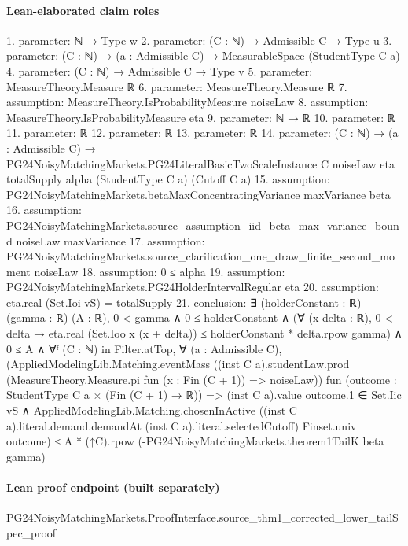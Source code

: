 \documentclass[10pt]{article}
\begin{document}
\paragraph{Lean-elaborated claim roles}\begin{ReviewVerbatim}
1. parameter: ℕ → Type w
2. parameter: (C : ℕ) → Admissible C → Type u
3. parameter: (C : ℕ) → (a : Admissible C) → MeasurableSpace (StudentType C a)
4. parameter: (C : ℕ) → Admissible C → Type v
5. parameter: MeasureTheory.Measure ℝ
6. parameter: MeasureTheory.Measure ℝ
7. assumption: MeasureTheory.IsProbabilityMeasure noiseLaw
8. assumption: MeasureTheory.IsProbabilityMeasure eta
9. parameter: ℕ → ℝ
10. parameter: ℝ
11. parameter: ℝ
12. parameter: ℝ
13. parameter: ℝ
14. parameter: (C : ℕ) →
  (a : Admissible C) →
    PG24NoisyMatchingMarkets.PG24LiteralBasicTwoScaleInstance C noiseLaw eta totalSupply alpha (StudentType C a)
      (Cutoff C a)
15. assumption: PG24NoisyMatchingMarkets.betaMaxConcentratingVariance maxVariance beta
16. assumption: PG24NoisyMatchingMarkets.source_assumption_iid_beta_max_variance_bound noiseLaw maxVariance
17. assumption: PG24NoisyMatchingMarkets.source_clarification_one_draw_finite_second_moment noiseLaw
18. assumption: 0 ≤ alpha
19. assumption: PG24NoisyMatchingMarkets.PG24HolderIntervalRegular eta
20. assumption: eta.real (Set.Ioi vS) = totalSupply
21. conclusion: ∃ (holderConstant : ℝ) (gamma : ℝ) (A : ℝ),
  0 < gamma ∧
    0 ≤ holderConstant ∧
      (∀ (x delta : ℝ), 0 < delta → eta.real (Set.Ioo x (x + delta)) ≤ holderConstant * delta.rpow gamma) ∧
        0 ≤ A ∧
          ∀ᶠ (C : ℕ) in Filter.atTop,
            ∀ (a : Admissible C),
              (AppliedModelingLib.Matching.eventMass
                  ((inst C a).studentLaw.prod (MeasureTheory.Measure.pi fun (x : Fin (C + 1)) => noiseLaw))
                  fun (outcome : StudentType C a × (Fin (C + 1) → ℝ)) =>
                  (inst C a).value outcome.1 ∈ Set.Iic vS ∧
                    AppliedModelingLib.Matching.chosenInActive
                      ((inst C a).literal.demand.demandAt (inst C a).literal.selectedCutoff) Finset.univ outcome) ≤
                A * (↑C).rpow (-PG24NoisyMatchingMarkets.theorem1TailK beta gamma)
\end{ReviewVerbatim}

\paragraph{Lean proof endpoint (built separately)}\begin{ReviewVerbatim}
PG24NoisyMatchingMarkets.ProofInterface.source_thm1_corrected_lower_tailSpec_proof
\end{ReviewVerbatim}
\end{document}
